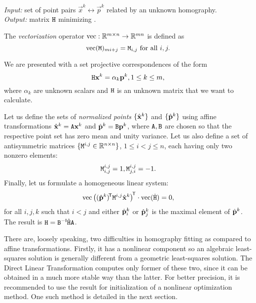 \textit{Input:} set of point pairs $\vec x^k \leftrightarrow \vec p^k$ related by an unknown homography.\\
\textit{Output:} matrix $\mathtt{H}$ minimizing .\\

\begin{definition}
The \textit{vectorization} operator $\mathrm{vec} : \mathbb{R}^{m \times n} \to \mathbb{R}^{mn}$ is defined as
$$\mathrm{vec}(\mathtt{M})_{m i + j} = \mathtt{M}_{i,j} \textrm{ for all } i, j.$$
\end{definition}

We are presented with a set projective correspondences of the form
\begin{equation} \label{e:homography-input}
\mathtt{H} \mathbf{x}^k = \alpha_k \mathbf{p}^k, 1 \leq k \leq m,
\end{equation}
where $\alpha_k$ are unknown scalars and $\mathtt{H}$ is an unknown matrix that we want to calculate.

Let us define the sets of \textit{normalized points} $\{ \hat{\mathbf{x}}^k \}$ and $\{ \hat{\mathbf{p}}^k \}$ using affine transformations $\hat{\mathbf{x}}^k = \mathtt{A} \mathbf{x}^k$ and $\hat{\mathbf{p}}^k = \mathtt{B} \mathbf{p}^k$, where $\mathtt{A}, \mathtt{B}$ are chosen so that the respective point set has zero mean and unity variance.
Let us also define a set of antisymmetric matrices $\{\mathtt{M}^{i, j} \in \mathbb{R}^{n \times n}\}$, $1 \leq i < j \leq n$, each having only two nonzero elements:
\begin{equation} \label{e:homography-antisymm}
\mathtt{M}^{i, j}_{i, j} = 1,
\mathtt{M}^{i, j}_{j, i} = -1.
\end{equation}
Finally, let us formulate a homogeneous linear system:
\begin{equation} \label{e:homography-system}
\mathrm{vec} \left(({\hat{\mathbf{p}}}^k)^{\!\mathsf{T}} \mathtt{M}^{i, j} {\hat{\mathbf{x}}}^k \right)^{\!\mathsf{T}} \cdot \mathrm{vec}(\hat{\mathtt{H}}) = 0,
\end{equation}
for all $i, j, k$ such that $i < j$ and either $\hat{\mathbf{p}}^k_i$ or $\hat{\mathbf{p}}^k_j$ is the maximal element of $\hat{\mathbf{p}}^k$.
The result is $\mathtt{H} = \mathtt{B} ^{-\mathsf{I}} \hat{\mathtt{H}} \mathtt{A}$.

There are, loosely speaking, two difficulties in homography fitting as compared to affine transformations.
Firstly, it has a nonlinear component so an algebraic least-squares solution is generally different from a geometric least-squares solution.
The Direct Linear Transformation computes only former of these two, since it can be obtained in a much more stable way than the latter.
For better precision, it is recommended to use the result for initialization of a nonlinear optimization method.
One such method is detailed in the next section.

